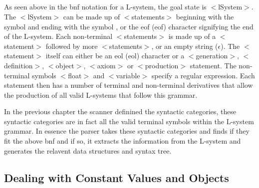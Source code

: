 \begin{singlespace}
\begin{bnf*}
		{\bnfts{*}}\\
		\\
		\\
		{}\\
		{}\\
		{\bnfts{==} \bnfor \bnfts{!=} \bnfor \bnfts{$<=$} \bnfor \bnfts{$>=$} \bnfor \bnfts{$>$} \bnfor \bnfts{$<$}}\\
		{}\\
		{\bnfes \bnfor {} }\\
		{}\\
	\end{bnf*}

\newpage

\end{singlespace} 

\noindent
As seen above in the \acrshort{bnf} notation for a L-system, the goal state is $<$lSystem$>$. The $<$lSystem$>$ can be made up of $<$statements$>$ beginning with the symbol \say{\#} and ending with the symbol \say{;}, or the \acrlong{eof} (\acrshort{eof}) character signifying the end of the L-system. Each non-terminal $<$statements$>$ is made up of a $<$statement$>$ followed by more $<$statements$>$, or an empty string ($\epsilon$). The $<$statement$>$ itself can either be an \acrlong{eol} (\acrshort{eol}) character or a $<$generation$>$, $<$definition$>$, $<$object$>$, $<$axiom$>$ or $<$production$>$ statement. The non-terminal symbols $<$float$>$ and $<$variable$>$ specify a regular expression. Each statement then has a number of terminal and non-terminal derivatives that allow the production of all valid L-systems that follow this grammar. 

In the previous chapter the scanner definined the syntactic categories, these syntactic categories are in fact all the valid terminal symbols within the L-system grammar. In essence the parser takes these syntactic categories and finds if they fit the above \acrshort{bnf} and if so, it extracts the information from the L-system and generates the relavent data structures and syntax tree. 

\subsection{Dealing with Constant Values and Objects}

